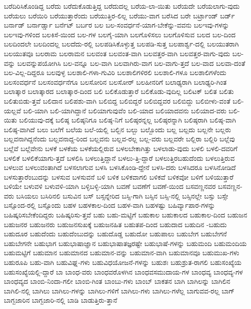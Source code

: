{ಬರೆದಿರಿಸಿಕೊಂಡಿದ್ದ
ಬರೆದು
ಬರೆದುಕೊಡುತ್ತಿದ್ದ
ಬರೆದುದಲ್ಲ
ಬರೆಯ-ಲಾ-ಯಿತು
ಬರೆಯದೇ
ಬರೆಯಲಾಗು-ವುದು
ಬರೆಯಲು
ಬರೆಯಿರಿ
ಬರೆಯುತ್ತಾರೆಂದು
ಬರೆಯುತ್ತಿರ-ಲಿಲ್ಲ
ಬರೆಯು-ವಾಗ
ಬರೆಸಿದ
ಬರೇ
ಬರ್ಟ್ರಾಂಡ್
ಬರ್ಡ್
ಬರ್ನಾಡ್
ಬರ್ನಾರ್ಡ್ಷಾ
ಬರ್ನೆಟ್
ಬರ್ಬರ
ಬಲ
ಬಲ-ಸಂವರ್ಧನೆ-ಯಾಗ-ಬೇಕೆನ್ನು-ವವನು
ಬಲಇವು-ಗಳನ್ನು
ಬಲಇವು-ಗಳಿಂದ
ಬಲಕಿಸೆ-ಯಿಂದ
ಬಲ-ಗಳ
ಬಲಗೈ-ಯಾಗಿ
ಬಲಗೊಳಿಸಲು
ಬಲಗೊಳಿಸುವ
ಬಲದ
ಬಲ-ದಿಂದ
ಬಲದಿಂದಲೇ
ಬಲದಿಂದಲ್ಲ
ಬಲದೆದು-ರಲ್ಲಿ
ಬಲಪಡಿಸಿಕೊಳ್ಳುತ್ತ
ಬಲಪಡಿ-ಸುತ್ತ
ಬಲಪಾರ್ಶ್ವ-ದಲ್ಲಿ
ಬಲಯುತರಾಗಿ
ಬಲಯುತವೂ
ಬಲರಾಮ
ಬಲರಾಮನ
ಬಲವಂತ
ಬಲವಂತ-ವಾಗಿ
ಬಲವತ್ತರ-ವಾಗಿ
ಬಲವತ್ತರ-ವಾಗು-ವುದು
ಬಲ-ವನ್ನು
ಬಲವನ್ನುಪಯೋಗಿಸಿ
ಬಲ-ವನ್ನೂ
ಬಲ-ವಾಗಿ
ಬಲವಾಗಿರು-ವಾಗ
ಬಲ-ವಾಗು-ತ್ತದೆ
ಬಲ-ವಾದ
ಬಲವಾ-ದಂತೆ
ಬಲ-ವಿಲ್ಲ-ದಿದ್ದರೂ
ಬಲವುಳ್ಳ
ಬಲಶಾಲಿ-ಗಳಾ-ಗುವಿರಿ
ಬಲಶಾಲಿಗಳಿರಲಿ
ಬಲಶಾಲಿ-ಗಳೂ
ಬಲಶಾಲಿಗಳೆಂದು
ಬಲಸಂವರ್ಧನೆ
ಬಲಸಂವರ್ಧನೆಗೂ
ಬಲಸೋರಿನ
ಬಲಸೋರ್
ಬಲಹೀನರಿಗೆ
ಬಲಾಢ್ಯರಾಗಿ
ಬಲಾಢ್ಯರಿ-ಗಿಂತ
ಬಲಾತ್ಕಾರ
ಬಲಾತ್ಕಾರದ
ಬಲಾತ್ಕಾರ-ದಿಂದ
ಬಲಿ
ಬಲಿಕೊಡುತ್ತಾರೆ
ಬಲಿಕೊಡು-ವುದಿಲ್ಲ
ಬಲಿಟಕ್
ಬಲಿತ
ಬಲಿತು
ಬಲಿತುಬಿಡು-ತ್ತವೆ
ಬಲಿದಾನ
ಬಲಿಪಶು-ವಾಗಿ
ಬಲಿಬಿದ್ದ
ಬಲಿಬಿದ್ದರೆ
ಬಲಿಬಿದ್ದವರ
ಬಲಿಬಿದ್ದು
ಬಲಿಬೀಳು-ವಂತೆ
ಬಲಿ-ಯಲ್ಲವೆ
ಬಲಿ-ಯಾಗಿ
ಬಲಿ-ಯಾಗಿದ್ದಾನೆ
ಬಲಿಯಾಗುವುವೆಂ
ಬಲಿ-ಯಾದ
ಬಲಿಯಾದವನು
ಬಲಿಯಾದ-ವರು
ಬಲಿ-ಯಿತು
ಬಲಿಯುವು-ದಕ್ಕೆ
ಬಲಿಷ್ಠ
ಬಲಿಷ್ಠನಿಗೂ
ಬಲಿಷ್ಠ-ನಿಗೆ
ಬಲಿಷ್ಠರನ್ನಲ್ಲ
ಬಲಿಷ್ಠರನ್ನಾಗಿ
ಬಲಿಷ್ಠರಾಗಿ
ಬಲಿಷ್ಠ-ವಾಗಿ
ಬಲಿಷ್ಠ-ವಾಗಿದೆ
ಬಲು
ಬಲೆಗೆ
ಬಲೆಯ
ಬಲೆ-ಯಲ್ಲಿ
ಬಲ್ಬಿನ
ಬಲ್ಬು
ಬಲ್ಬೊಂದು
ಬಲ್ಲ
ಬಲ್ಲದು
ಬಲ್ಲನೇ
ಬಲ್ಲರು
ಬಲ್ಲವನಾಗಿದ್ದನೆಂದು
ಬಲ್ಲವನಾದ್ದ-ರಿಂದ
ಬಲ್ಲವನು
ಬಲ್ಲವ-ರಲ್ಲ
ಬಲ್ಲ-ವರು
ಬಲ್ಲವರೇ
ಬಲ್ಲಿರಾ
ಬಲ್ಲಿರಿ
ಬಲ್ಲೆವು
ಬಲ್ಲೆವೆ
ಬಲ್ಲೆವೇನು
ಬಳಕೆ
ಬಳಕೆಯ
ಬಳಕೆಯಲ್ಲಿರುವ
ಬಳಲಬೇಕಾಗಿತ್ತು
ಬಳಲಾಡು-ವುದು
ಬಳಲಿ
ಬಳಲಿ-ದವರಿಗೆ
ಬಳಲಿಕೆ
ಬಳಲಿಕೆಯಾಗು-ತ್ತದೆ
ಬಳಲಿಸಿ
ಬಳಲುತ್ತಿದ್ದಾನೆ
ಬಳಲು-ತ್ತಿ-ದ್ದಾರೆ
ಬಳಲುತ್ತಿರಬಹುದೆಂದು
ಬಳಲುತ್ತಿರುವ
ಬಳಲುವ
ಬಳಲುವಂತಾಗಿದೆ
ಬಳಸಲಾಗುವ
ಬಳಸಿ
ಬಳಸಿಕೊಂಡಿ-ದ್ದೇನೆ
ಬಳಸಿ-ದರು
ಬಳಸಿದರೂ
ಬಳಸಿನೋಡಿದೆ
ಬಳಸುತ್ತಾರೆಂಬುದನ್ನು
ಬಳಸುವ
ಬಳಸುವನೆ
ಬಳಿ
ಬಳಿಕ
ಬಳಿಕವಾಗಲಿ
ಬಳಿಕವೆ
ಬಳಿಕವೋ
ಬಳಿಗೆ
ಬಳಿಯುತ್ತಾರೆ
ಬಳಿಯೇ
ಬಳುವಳಿ
ಬಳುವಳಿ-ಯಾಗಿ
ಬಳ್ಳಿಬಳ್ಳಿ-ಯಾಗಿ
ಬವಣೆ
ಬವಣೆಗೆ
ಬವಣೆ-ಯಿಂದ
ಬಸವಣ್ಣನವರ
ಬಸವಣ್ಣನ-ವರು
ಬಸಿಯಲು
ಬಸಿರಿನಲಿ
ಬಸುವಿನ
ಬಸ್
ಬಸ್ಸನ್ನೇರಿದ
ಬಸ್ಸಿ-ಗಾಗಿ
ಬಸ್ಸಿನ
ಬಸ್ಸಿ-ನಲ್ಲಿ
ಬಸ್ಸಿನಲ್ಲೇ
ಬಸ್ಸು
ಬಸ್ಸೇ
ಬಸ್ಸೊಂದ-ರಲ್ಲಿ
ಬಸ್ಸೊಂದು
ಬಹಳ
ಬಹಳಕಾಲ-ದಿಂದ
ಬಹಳ-ವಾಗಿ
ಬಹಳಷ್ಟು
ಬಹಿರ್ವ್ಯಾಪಾರ-ಗಳನ್ನು
ಬಹಿಷ್ಕರಿಸಬೇಕೆಂದಿದ್ದರು
ಬಹಿಷ್ಕರಿಸು-ತ್ತವೆ
ಬಹು
ಬಹು-ಮಟ್ಟಿಗೆ
ಬಹುಕಾಲ
ಬಹುಕಾಲದ
ಬಹುಕಾಲ-ದಿಂದ
ಬಹುಜನ
ಬಹುಜನರ
ಬಹುಜನರು
ಬಹುಜನಸುಖಕ್ಕೆ
ಬಹುಜನಹಿತ
ಬಹುತಪ-ದಿಂದ
ಬಹುದಾದ
ಬಹುದಿನ
-ಬಹುದು
ಬಹುದೂರ
ಬಹುದೆಂದು
ಬಹುದೆಂಬುದನ್ನು
ಬಹುದೊಡ್ಡ
ಬಹುದೋ
ಬಹುಪಾಲು
ಬಹುಬೇಗ
ಬಹುಬೇಗನೆ
ಬಹುಬೇಗನೇ
ಬಹುಭಾಗ
ಬಹುಭಾಷಾಜ್ಞಾನ
ಬಹುಭಾಷಾತಜ್ಞರಷ್ಟೇ
ಬಹುಭಾಷೆ-ಗಳನ್ನು
ಬಹುಮಂದಿ
ಬಹುಮಂದಿಯ
ಬಹುಮಟ್ಟಿಗೆ
ಬಹುಮಾನ
ಬಹುಮಾನದ
ಬಹುಮಾನ-ವನ್ನು
ಬಹುಮಾನ-ವಾಗಿ
ಬಹುಮಾನವೂ
ಬಹುಮುಖ-ಗಳು
ಬಹುರೂಪಿ
ಬಹು-ವಾಗಿ
ಬಹುವಿಘ್ನ-ಗಳು
ಬಹುವಿಧಯೋಜನೆ-ಗಳನ್ನು
ಬಹುಶಃ
ಬಹುಶ್ರುತ-ರಾಗಲಿ
ಬಹುಸಂಖ್ಯೆಯ
ಬಹುಸಂಖ್ಯೆಯಲ್ಲಿ-ದ್ದಾರೆ
ಬಾ
ಬಾಂಧ-ವರು
ಬಾಂಧವರೊಳಗಿನ
ಬಾಂಧವಸಮುದಾಯ-ಗಳ
ಬಾಂಧವ್ಯ
ಬಾಂಧವ್ಯ-ಗಳ
ಬಾಂಧವ್ಯದ
ಬಾಂಬಿ-ನಿಂದಾ-ಗಲೀ
ಬಾಂಬಿ-ಗಿಂತ
ಬಾಂಬು-ಗಳು
ಬಾಂಬ್
ಬಾಕತನ
ಬಾಗಿ
ಬಾಗಿಲನ್ನು
ಬಾಗಿಲಿನ
ಬಾಗಿಲಿ-ನಲ್ಲಿ
ಬಾಗಿಲು
ಬಾಗಿಲು-ಗಳನ್ನು
ಬಾಗಿಲು-ಗಳಿಗೆ
ಬಾಗಿಲು-ಗಳು
ಬಾಗಿಲು-ಗಳೆಲ್ಲ
ಬಾಗುವವ-ರಲ್ಲ
ಬಾಗ್
ಬಾಗ್ಬಜಾರಿನ
ಬಾಗ್ಬಜಾರಿ-ನಲ್ಲಿ
ಬಾಡಿ
ಬಾಡುತ್ತಿರು-ತ್ತಾನೆ
}

